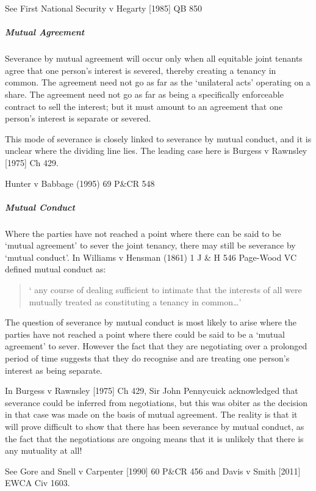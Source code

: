 \documentclass[
]{article}
\begin{document}
See First National Security v Hegarty {[}1985{]} QB 850

\hypertarget{mutual-agreement}{%
\subparagraph{Mutual Agreement}\label{mutual-agreement}}

Severance by mutual agreement will occur only when all equitable joint
tenants agree that one person's interest is severed, thereby creating a
tenancy in common. The agreement need not go as far as the `unilateral
acts' operating on a share. The agreement need not go as far as being a
specifically enforceable contract to sell the interest; but it must
amount to an agreement that one person's interest is separate or
severed.

This mode of severance is closely linked to severance by mutual conduct,
and it is unclear where the dividing line lies. The leading case here is
Burgess v Rawnsley {[}1975{]} Ch 429.

Hunter v Babbage (1995) 69 P\&CR 548

\hypertarget{mutual-conduct}{%
\subparagraph{Mutual Conduct}\label{mutual-conduct}}

Where the parties have not reached a point where there can be said to be
`mutual agreement' to sever the joint tenancy, there may still be
severance by `mutual conduct'. In Williams v Hensman (1861) 1 J \& H 546
Page-Wood VC defined mutual conduct as:

\begin{quote}
` any course of dealing sufficient to intimate that the interests of all
were mutually treated as constituting a tenancy in common\ldots'
\end{quote}

The question of severance by mutual conduct is most likely to arise
where the parties have not reached a point where there could be said to
be a `mutual agreement' to sever. However the fact that they are
negotiating over a prolonged period of time suggests that they do
recognise and are treating one person's interest as being separate.

In Burgess v Rawnsley {[}1975{]} Ch 429, Sir John Pennycuick
acknowledged that severance could be inferred from negotiations, but
this was obiter as the decision in that case was made on the basis of
mutual agreement. The reality is that it will prove difficult to show
that there has been severance by mutual conduct, as the fact that the
negotiations are ongoing means that it is unlikely that there is any
mutuality at all!

See Gore and Snell v Carpenter {[}1990{]} 60 P\&CR 456 and Davis v Smith
{[}2011{]} EWCA Civ 1603.
\end{document}
